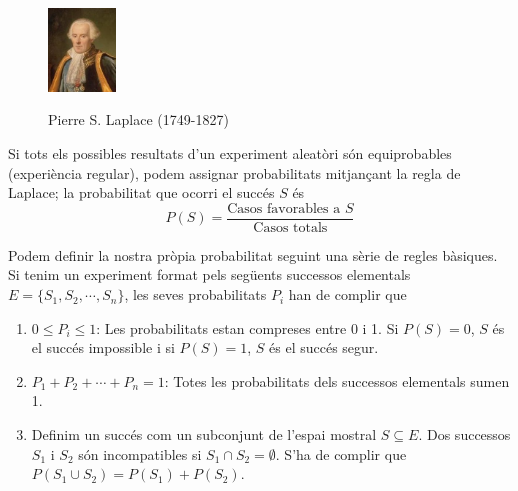 \begin{theorybox}
 	 
 	\begin{figure} 
 		\vspace{-1cm}
 		\begin{center}
 			\includegraphics[width=0.16\textwidth]{img-12/laplace}
 			\par \footnotesize Pierre S. Laplace (1749-1827) 
 		\end{center}
 	\end{figure}
 
   Si  tots els possibles resultats d'un experiment aleatòri són equiprobables (experiència regular), podem assignar probabilitats mitjançant la regla de Laplace; la probabilitat que ocorri el succés $S$ és
   \begin{equation}
   	P(S) = \dfrac{\text{Casos favorables a } S}{\text{Casos totals}}
   \end{equation}
   \vspace{1cm}
\end{theorybox}
\newpage
\begin{theorybox}
	Podem definir la nostra pròpia probabilitat seguint una sèrie de regles bàsiques. Si tenim un experiment format pels següents successos elementals $E=\{S_1, S_2, \cdots, S_n\}$, les seves probabilitats $P_i$ han de complir que
	\begin{enumerate}
		\item $0\leq P_i \leq 1$: Les probabilitats estan compreses entre 0 i 1. Si $P(S)=0$, $S$ és el succés impossible i si $P(S)=1$, $S$ és el succés segur.
		
		\item $P_1+P_2+\cdots+P_n=1$: Totes les probabilitats dels successos elementals sumen 1.
		
		\item Definim un succés com un subconjunt de l'espai mostral $S \subseteq E$. Dos successos $S_1$ i $S_2$ són incompatibles si $S_1 \cap S_2 = \emptyset$. S'ha de complir que $P( S_1 \cup S_2)= P(S_1)+P(S_2)$.
		
	\end{enumerate}
\end{theorybox}

